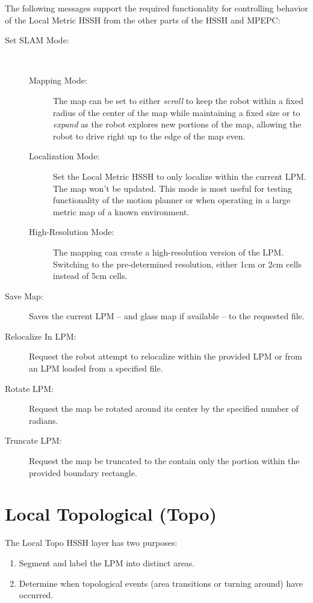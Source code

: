 \documentclass{article}
\begin{document}
The following messages support the required functionality for controlling behavior of the Local Metric HSSH from the 
other parts of the HSSH and MPEPC:

\begin{description}
 \item[Set SLAM Mode:] \hfill \\
    \begin{description}
     \item[Mapping Mode:] The map can be set to either \emph{scroll} to keep the robot within a fixed radius of the 
        center of the map while maintaining a fixed size or to \emph{expand} as the robot explores new portions of 
        the map, allowing the robot to drive right up to the edge of the map even.
     \item[Localization Mode:] Set the Local Metric HSSH to only localize within the current LPM. The map won't be 
        updated. This mode is most useful for testing functionality of the motion planner or when operating in a large 
        metric map of a known environment.
     \item[High-Resolution Mode:] The mapping can create a high-resolution version of the LPM. Switching to the 
        pre-determined resolution, either 1cm or 2cm cells instead of 5cm cells.
    \end{description}

 \item[Save Map:] Saves the current LPM -- and glass map if available -- to the requested file.
 
 \item[Relocalize In LPM:] Request the robot attempt to relocalize within the provided LPM or from an LPM loaded from a 
    specified file.
 \item[Rotate LPM:] Request the map be rotated around its center by the specified number of radians.
 \item[Truncate LPM:] Request the map be truncated to the contain only the portion within the provided boundary 
    rectangle.
\end{description}


\section{Local Topological (Topo)}

The Local Topo HSSH layer has two purposes:

\begin{enumerate}
 \item Segment and label the LPM into distinct areas.
 \item Determine when topological events (area transitions or turning around) have occurred.
\end{enumerate}
\end{document}
